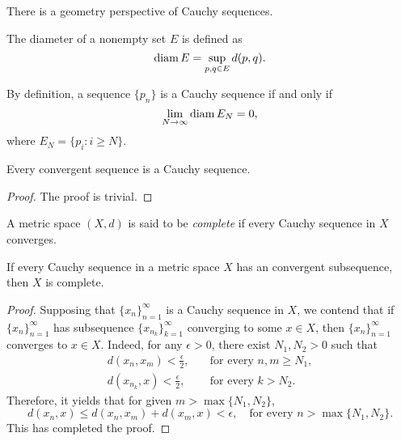 There is a geometry perspective of Cauchy sequences.
\begin{defn}
The diameter of a nonempty set $E$ is defined as 
\begin{equation}
    \operatorname{diam} E = \sup_{p, q \in E} d(p, q).
\end{equation}
\end{defn}
By definition, a sequence $\{p_n\}$ is a Cauchy sequence if and only if 
\begin{equation*}
    \lim _{N\to \infty} \operatorname{diam} E_N = 0, 
\end{equation*}
where $E_N = \{p_i : i \ge N\}$.

\begin{prop}
Every convergent sequence is a Cauchy sequence. 
\end{prop}
\begin{proof}
The proof is trivial. 
\end{proof}

\begin{defn}
A metric space $(X, d)$ is said to be \emph{complete} if every Cauchy 
sequence in $X$ converges. 
\end{defn}

\begin{thm}
\label{thm:metric_spaces:completeness:convergent_subsequence}
If every Cauchy sequence in a metric space $X$ has an convergent 
subsequence, then $X$ is complete. 
\end{thm}
\begin{proof}
Supposing that $\{ x_n \}_{n=1}^{\infty}$ is a Cauchy sequence in $X$, 
we contend that if $\{ x_n \}_{n=1}^{\infty}$ has subsequence $\{x_{n_k}\}
_{k=1}^\infty$ converging to some $x \in X$, then $\{ x_n \}
_{n=1}^{\infty}$ converges to $x \in X$. 
Indeed, for any $\epsilon > 0$, there exist $N_1, N_2 > 0$ such that 
\begin{align*}
    d(x_n, x_m) < \frac{\epsilon}{2}, \quad & \text{for every } n, m \ge N_1, \\
    d(x_{n_k}, x) < \frac{\epsilon}{2}, \quad & \text{for every } k > N_2. 
\end{align*} 
Therefore, it yields that for given $m > \max\{N_1, N_2\}$, 
\begin{equation*}
    d(x_n, x) \le d(x_n, x_m) + d(x_m, x) < \epsilon, \quad 
    \text{for every } n > \max\{N_1, N_2\}. 
\end{equation*} 
This has completed the proof. 
\end{proof}


